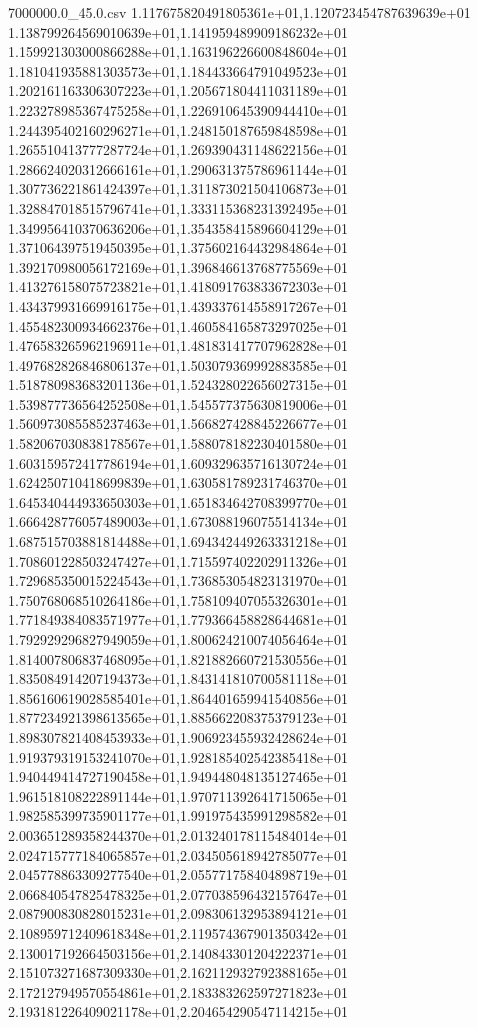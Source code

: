 \begin{filecontents*}{7000000.0_45.0.csv}
1.117675820491805361e+01,1.120723454787639639e+01
1.138799264569010639e+01,1.141959489909186232e+01
1.159921303000866288e+01,1.163196226600848604e+01
1.181041935881303573e+01,1.184433664791049523e+01
1.202161163306307223e+01,1.205671804411031189e+01
1.223278985367475258e+01,1.226910645390944410e+01
1.244395402160296271e+01,1.248150187659848598e+01
1.265510413777287724e+01,1.269390431148622156e+01
1.286624020312666161e+01,1.290631375786961144e+01
1.307736221861424397e+01,1.311873021504106873e+01
1.328847018515796741e+01,1.333115368231392495e+01
1.349956410370636206e+01,1.354358415896604129e+01
1.371064397519450395e+01,1.375602164432984864e+01
1.392170980056172169e+01,1.396846613768775569e+01
1.413276158075723821e+01,1.418091763833672303e+01
1.434379931669916175e+01,1.439337614558917267e+01
1.455482300934662376e+01,1.460584165873297025e+01
1.476583265962196911e+01,1.481831417707962828e+01
1.497682826846806137e+01,1.503079369992883585e+01
1.518780983683201136e+01,1.524328022656027315e+01
1.539877736564252508e+01,1.545577375630819006e+01
1.560973085585237463e+01,1.566827428845226677e+01
1.582067030838178567e+01,1.588078182230401580e+01
1.603159572417786194e+01,1.609329635716130724e+01
1.624250710418699839e+01,1.630581789231746370e+01
1.645340444933650303e+01,1.651834642708399770e+01
1.666428776057489003e+01,1.673088196075514134e+01
1.687515703881814488e+01,1.694342449263331218e+01
1.708601228503247427e+01,1.715597402202911326e+01
1.729685350015224543e+01,1.736853054823131970e+01
1.750768068510264186e+01,1.758109407055326301e+01
1.771849384083571977e+01,1.779366458828644681e+01
1.792929296827949059e+01,1.800624210074056464e+01
1.814007806837468095e+01,1.821882660721530556e+01
1.835084914207194373e+01,1.843141810700581118e+01
1.856160619028585401e+01,1.864401659941540856e+01
1.877234921398613565e+01,1.885662208375379123e+01
1.898307821408453933e+01,1.906923455932428624e+01
1.919379319153241070e+01,1.928185402542385418e+01
1.940449414727190458e+01,1.949448048135127465e+01
1.961518108222891144e+01,1.970711392641715065e+01
1.982585399735901177e+01,1.991975435991298582e+01
2.003651289358244370e+01,2.013240178115484014e+01
2.024715777184065857e+01,2.034505618942785077e+01
2.045778863309277540e+01,2.055771758404898719e+01
2.066840547825478325e+01,2.077038596432157647e+01
2.087900830828015231e+01,2.098306132953894121e+01
2.108959712409618348e+01,2.119574367901350342e+01
2.130017192664503156e+01,2.140843301204222371e+01
2.151073271687309330e+01,2.162112932792388165e+01
2.172127949570554861e+01,2.183383262597271823e+01
2.193181226409021178e+01,2.204654290547114215e+01

\end{filecontents*}
